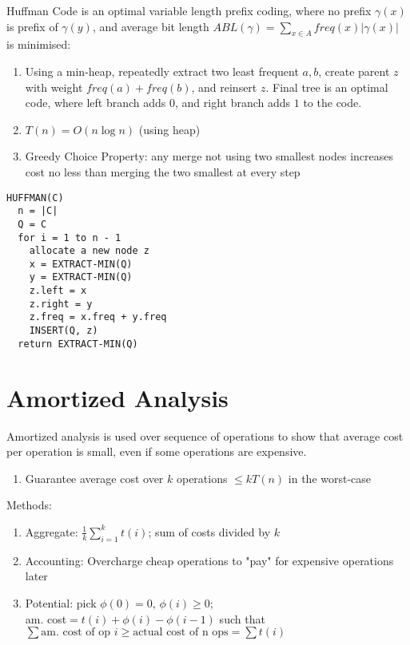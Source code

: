 \documentclass[12pt, a4paper]{article}
\begin{document}
\begin{multicols*}{3}
\colbreak
Huffman Code is an optimal variable length prefix coding, where no prefix $\gamma(x)$ is prefix of $\gamma(y)$, and average bit length $ABL(\gamma) = \sum_{x\in A} freq(x)|\gamma(x)|$ is minimised:\\\vspace{1em}
{\centering
{}
\par}
\begin{enumerate}[\roman*.]
  \item Using a min-heap, repeatedly extract two least frequent $a, b$, create parent $z$ with weight $freq(a) + freq(b)$, and reinsert $z$. Final tree is an optimal code, where left branch adds $0$, and right branch adds $1$ to the code. 
  \item $T(n)=O(n\log n)$ (using heap)
  \item Greedy Choice Property: any merge not using two smallest nodes increases cost no less than merging the two smallest at every step 
\end{enumerate}
\begin{lstlisting}
HUFFMAN(C)
  n = |C|
  Q = C
  for i = 1 to n - 1
    allocate a new node z
    x = EXTRACT-MIN(Q)
    y = EXTRACT-MIN(Q)
    z.left = x
    z.right = y
    z.freq = x.freq + y.freq
    INSERT(Q, z)
  return EXTRACT-MIN(Q)
\end{lstlisting}

\colbreak
\section{Amortized Analysis}

Amortized analysis is used over sequence of operations to show that average cost per operation is small, even if some operations are expensive.
\begin{enumerate}[\roman*.]
  \item Guarantee average cost over $k$ operations $\leq k T(n)$ in the worst-case
\end{enumerate}

Methods:
\begin{enumerate}[\roman*.]
  \item Aggregate: $\frac{1}{k} \sum^k_{i=1}t(i)$; sum of costs divided by $k$ 
  \item Accounting: Overcharge cheap operations to "pay" for expensive operations later
  \item Potential: pick $\phi(0)=0$, $\phi(i)\ge 0$;\\ am. cost$ = t(i)+\phi(i)-\phi(i-1)$ such that\\ $\sum \text{am. cost of op $i$} \geq \text{actual cost of n ops} = \sum t(i)$ 
\end{enumerate}


\end{multicols*}
\end{document}
